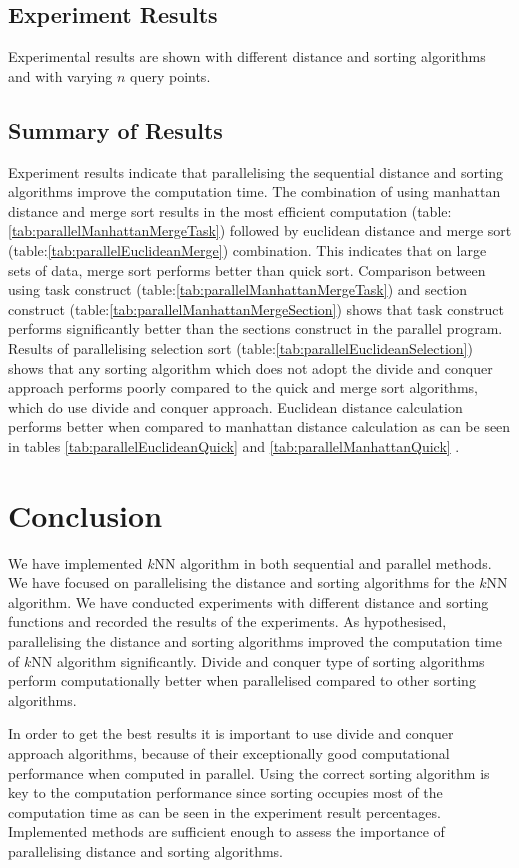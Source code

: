 \subsection{Experiment Results}
Experimental results are shown with different distance and sorting algorithms and with varying $n$ query points.


\subsection{Summary of Results}
Experiment results indicate that parallelising the sequential distance and sorting algorithms improve the computation time. The combination of using manhattan distance and merge sort results in the most efficient computation (table:\ref{tab:parallelManhattanMergeTask}) followed by euclidean distance and merge sort (table:\ref{tab:parallelEuclideanMerge}) combination. This indicates that on large sets of data, merge sort performs better than quick sort. Comparison between using task construct (table:\ref{tab:parallelManhattanMergeTask}) and section construct (table:\ref{tab:parallelManhattanMergeSection}) shows that task construct performs significantly better than the sections construct in the parallel program. Results of parallelising selection sort (table:\ref{tab:parallelEuclideanSelection}) shows that any sorting algorithm which does not adopt the divide and conquer approach performs poorly compared to the quick and merge sort algorithms, which do use divide and conquer approach. Euclidean distance calculation performs better when compared to manhattan distance calculation as can be seen in tables \ref{tab:parallelEuclideanQuick} and \ref{tab:parallelManhattanQuick} .

\section{Conclusion} 
We have implemented $k$NN algorithm in both sequential and parallel methods. We have focused on parallelising the distance and sorting algorithms for the $k$NN algorithm. We have conducted experiments with different distance and sorting functions and recorded the results of the experiments. As hypothesised, parallelising the distance and sorting algorithms improved the computation time of $k$NN algorithm significantly. Divide and conquer type of sorting algorithms perform computationally better when parallelised compared to other sorting algorithms. 

In order to get the best results it is important to use divide and conquer approach algorithms,  because of their exceptionally good computational performance when computed in parallel. Using the correct sorting algorithm is key to the computation performance since sorting occupies most of the computation time as can be seen in the experiment result percentages. Implemented methods are sufficient enough to assess the importance of parallelising distance and sorting algorithms.

\newpage



 

